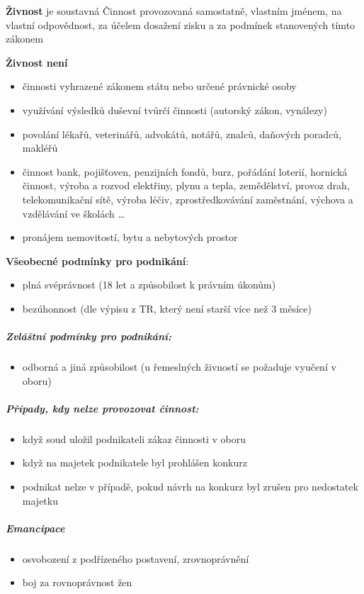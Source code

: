 \documentclass[11pt,a4paper,twoside]{book}
\begin{document}
	
	\textbf{Živnost} je soustavná Činnost provozovaná samostatně, vlastním jménem, na vlastní
	odpovědnost, za účelem dosažení zisku a za podmínek stanovených tímto zákonem
	
	\textbf{Živnost není}
	\begin{itemize}
		\item činnosti vyhrazené zákonem státu nebo určené právnické osoby
		\item využívání výsledků duševní tvůrčí činnosti (autorský zákon, vynálezy)
		\item povolání lékařů, veterinářů, advokátů, notářů, znalců, daňových poradců, makléřů
		\item činnost bank, pojišťoven, penzijních fondů, burz, pořádání loterií, hornická činnost, výroba a rozvod elektřiny, plynu a tepla, zemědělství, provoz drah, telekomunikační sítě, výroba léčiv, zprostředkovávání zaměstnání, výchova a vzdělávání ve školách \ldots
		\item pronájem nemovitostí, bytu a nebytových prostor
	\end{itemize}
	
	\textbf{Všeobecné podmínky pro podnikání}:
	\begin{itemize}
		\item plná svéprávnost (18 let a způsobilost k právním úkonům)
		\item bezúhonnost (dle výpisu z TR, který není starší více než 3 měsíce)
	\end{itemize}
	
	\subparagraph{Zvláštní podmínky pro podnikání:}
	\begin{itemize}
		\item odborná a jiná způsobilost (u řemeslných živností se požaduje vyučení v oboru)
	\end{itemize}
	
	\subparagraph{Případy, kdy nelze provozovat činnost:}
	\begin{itemize}
		\item když soud uložil podnikateli zákaz činnosti v oboru
		\item když na majetek podnikatele byl prohlášen konkurz
		\item podnikat nelze v případě, pokud návrh na konkurz byl zrušen pro nedostatek majetku
	\end{itemize}
	
	\subparagraph{Emancipace}
	\begin{itemize}
		\item osvobození z podřízeného postavení, zrovnoprávnění
		\item boj za rovnoprávnost žen
	\end{itemize}
	
\end{document}
